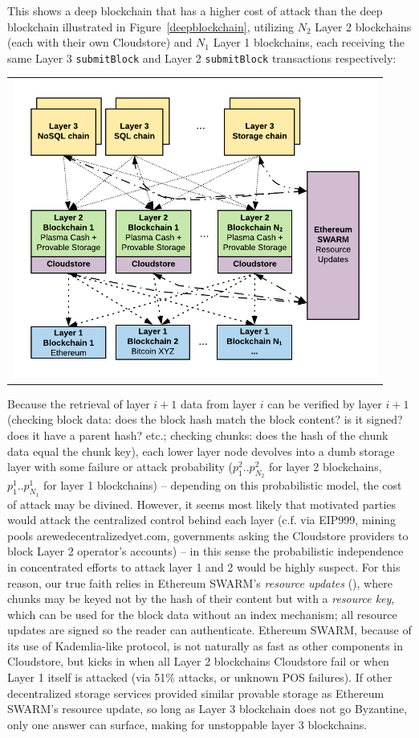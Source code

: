 \documentclass{article}
\begin{document}
This shows a deep blockchain that has a higher cost of attack than the deep blockchain illustrated in Figure~\ref{deepblockchain}, utilizing $N_2$ Layer 2 blockchains (each with their own Cloudstore) and $N_1$ Layer 1 blockchains, each receiving the same Layer 3 \texttt{submitBlock} and Layer 2 \texttt{submitBlock} transactions respectively:

\begin{tabular}{c}
\centerline{\includegraphics[width=12cm]{DeepBlockchain2.png}} \\
\end{tabular}

\noindent Because the retrieval of layer $i+1$ data from layer $i$ can be verified by layer $i+1$ (checking block data: does the block hash match the block content?  is it signed?  does it have a parent hash? etc.; checking chunks: does the hash of the chunk data equal the chunk key), each lower layer node devolves into a dumb storage layer with some failure or attack probability ($p^2_{1}..p^2_{N_2}$ for layer 2 blockchains, $p_1^{1}..p^1_{N_1}$ for layer 1 blockchains) -- depending on this probabilistic model, the cost of attack may be divined.   However, it seems most likely that motivated parties would attack the centralized control behind each layer (c.f. via EIP999, mining pools arewedecentralizedyet.com, governments asking the Cloudstore providers to block Layer 2 operator's accounts) -- in this sense the probabilistic independence in concentrated efforts to attack layer 1 and 2 would be highly suspect.   For this reason, our true faith relies in Ethereum SWARM's {\em resource updates} (\cite{swarm}), where chunks may be keyed not by the hash of their content but with a {\em resource key}, which can be used for the block data without an index mechanism; all resource updates are signed so the reader can authenticate.  Ethereum SWARM, because of its use of Kademlia-like protocol, is not naturally as fast as other components in Cloudstore, but kicks in when all Layer 2 blockchains Cloudstore fail or when Layer 1 itself is attacked (via 51\% attacks, or unknown POS failures).   If other decentralized storage services provided similar provable storage as Ethereum SWARM's resource update, so long as Layer 3 blockchain does not go Byzantine, only one answer can surface, making for unstoppable layer 3 blockchains. 
 
\end{document}
